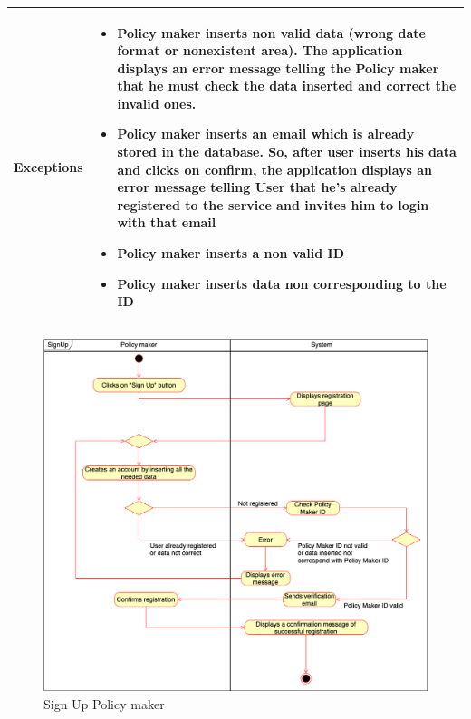 \begin{longtable}{p{} | p{}}
        \textbf{Exceptions} & 
        \begin{itemize}
            \item Policy maker inserts non valid data (wrong date format or nonexistent area). The application displays an error message telling the Policy maker that he must check the data inserted and correct the invalid ones. 
            \item Policy maker inserts an email which is already stored in the database. So, after user inserts his data and clicks on confirm, the application displays an error message telling User that he’s already registered to the service and invites him to login with that email
            \item Policy maker inserts a non valid ID
            \item Policy maker inserts data non corresponding to the ID
        \end{itemize}\\
        \hline
       
        
    \end{longtable}

\begin{figure}[h!]
        \centering
        \includegraphics[scale=0.30]{images/use_cases_diagram/policymaker_sign_up.png}
        \caption{Sign Up Policy maker}
        \label{fig:policymaker_sign_up}
    \end{figure}
\FloatBarrier

